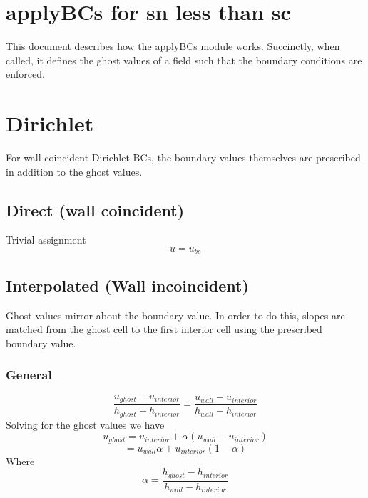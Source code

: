 \documentclass[11pt]{article}
\begin{document}
\doublespacing
\MOONSTITLE
\maketitle

\section{applyBCs for sn less than sc}

This document describes how the applyBCs module works. Succinctly, when called, it defines the ghost values of a field such that the boundary conditions are enforced.

\section{Dirichlet}
For wall coincident Dirichlet BCs, the boundary values themselves are prescribed in addition to the ghost values.

\subsection{Direct (wall coincident)}
Trivial assignment
\begin{equation}
u = u_{bc}
\end{equation}

\subsection{Interpolated (Wall incoincident)}
Ghost values mirror about the boundary value. In order to do this, slopes are matched from the ghost cell to the first interior cell using the prescribed boundary value.

\subsubsection{General}
\begin{equation}
	\frac{u_{ghost}-u_{interior}}{h_{ghost}-h_{interior}}
	=
	\frac{u_{wall}-u_{interior}}{h_{wall}-h_{interior}}
\end{equation}
Solving for the ghost values we have
\begin{equation}
	u_{ghost}
	=
	u_{interior} + \alpha (u_{wall}-u_{interior})
\end{equation}
\begin{equation}
	=
	u_{wall}\alpha + u_{interior}(1-\alpha)
\end{equation}
Where
\begin{equation}
	\alpha = \frac{h_{ghost}-h_{interior}}{h_{wall}-h_{interior}}
\end{equation}
\end{document}
